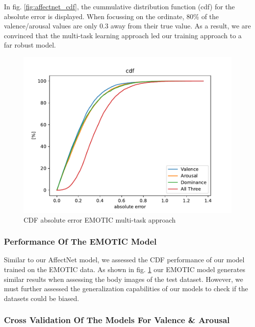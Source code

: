 \documentclass[conference]{IEEEtran}
\begin{document}
In fig. \ref{fig:affectnet_cdf}, the cummulative distribution function (cdf) for the absolute error is displayed. When focussing on the ordinate, 80\% of the valence/arousal values are only 0.3 away from their true value. As a result, we are convinced that the multi-task learning approach led our training approach to a far robust model.

\begin{figure}[h]
    \centering
    \includegraphics[width=\columnwidth]{pictures/emotic/emotic_cdf.pdf}
    \caption{CDF absolute error EMOTIC multi-task approach}
    \label{fig:emotic_cdf}
\end{figure}

\subsubsection{Performance Of The EMOTIC Model}

Similar to our AffectNet model, we assessed the CDF performance of our model trained on the EMOTIC data. As shown in fig. \ref{fig:emotic_cdf} our EMOTIC model generates similar results when assessing the body images of the test dataset. However, we must further assessed the generalization capabilities of our models to check if the datasets could be biased. \\


\subsubsection{Cross Validation Of The Models For Valence \& Arousal}
\end{document}
